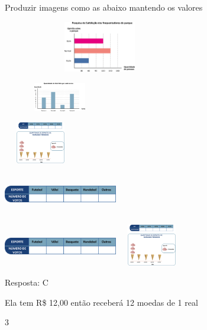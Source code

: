 \begin{escolha}
Produzir imagens como as abaixo mantendo os valores

\includegraphics[width=3.34196in,height=0.88341in]{media/image82.png}

\begin{escolha}

\item
\includegraphics[width=1.93350in,height=0.50004in]{media/image83.png}

\item
\includegraphics[width=1.26678in,height=0.72506in]{media/image84.png}

\item
\includegraphics[width=1.95850in,height=0.69173in]{media/image85.png}

\item
\includegraphics[width=1.95850in,height=0.69173in]{media/image85.png}\includegraphics[width=1.26678in,height=0.72506in]{media/image84.png}
\end{escolha}

Resposta: C

Ela tem R\$ 12,00 então receberá 12 moedas de 1 real

\num{3}


\end{escolha}

